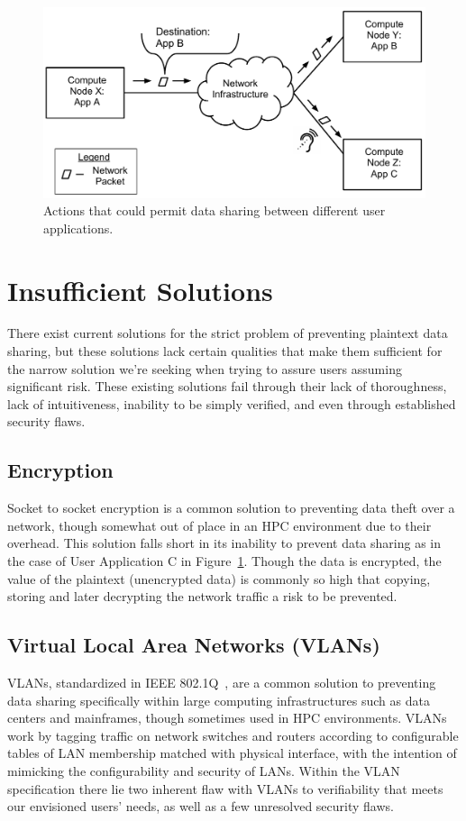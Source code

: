 \documentclass[oneside,12pt]{memoir}
\begin{document}
\begin{figure}
\centering
\includegraphics[scale=0.6]{illegal_actions.pdf}
\caption{Actions that could permit data sharing between different user applications.}
\label{fig:illegal_actions}
\end{figure}



\section{Insufficient Solutions}
\label{sec:insufficient_solutions}
There exist current solutions for the strict problem of preventing plaintext data sharing, but these solutions lack certain qualities that make them sufficient for the narrow solution we're seeking when trying to assure users assuming significant risk. These existing solutions fail through their lack of thoroughness, lack of intuitiveness, inability to be simply verified, and even through established security flaws. 
\subsection{Encryption}
Socket to socket encryption is a common solution to preventing data theft over a network, though somewhat out of place in an HPC environment due to their overhead. This solution falls short in its inability to prevent data sharing as in the case of User Application C in Figure~\ref{fig:illegal_actions}. Though the data is encrypted, the value of the plaintext (unencrypted data) is commonly so high that copying, storing and later decrypting the network traffic a risk to be prevented.
\subsection{Virtual Local Area Networks (VLANs)}
VLANs, standardized in IEEE 802.1Q~\cite{ieee_vlan}, are a common solution to preventing data sharing specifically within large computing infrastructures such as data centers and mainframes, though sometimes used in HPC environments. VLANs work by tagging traffic on network switches and routers according to configurable tables of LAN membership matched with physical interface, with the intention of mimicking the configurability and security of LANs. Within the VLAN specification there lie two inherent flaw with VLANs to verifiability that meets our envisioned users' needs, as well as a few unresolved security flaws. 
\end{document}

